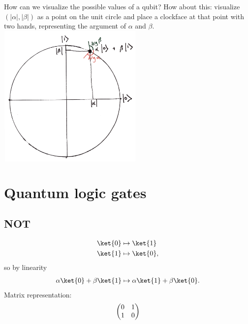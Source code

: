 How can we visualize the possible values of a qubit? How about this: visualize $(|\alpha|, |\beta|)$
as a point on the unit circle and place a clockface at that point with two hands, representing the argument
of $\alpha$ and $\beta$.\\
\includegraphics[width=200pt]{img/quantum-qubit.png}


\section{Quantum logic gates}
\subsection{NOT}
\begin{align*}
  \ket{0} &\mapsto \ket{1}\\
  \ket{1} &\mapsto \ket{0},
\end{align*}
so by linearity
\begin{align*}
  \alpha \ket{0} + \beta \ket{1} \mapsto \alpha \ket{1} + \beta \ket{0}.
\end{align*}
Matrix representation:
\begin{align*}
  \begin{pmatrix}0 & 1\\1 & 0\\ \end{pmatrix}
\end{align*}